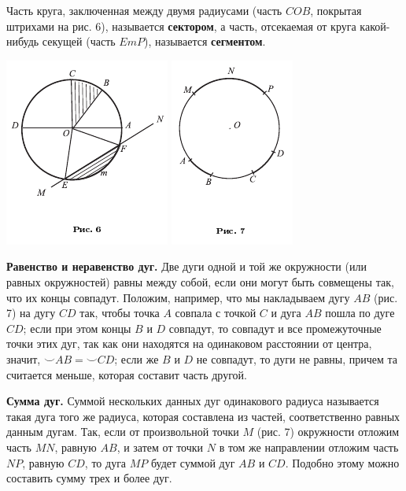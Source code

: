 \documentclass[oneside]{book}
\begin{document}
Часть круга, заключенная между двумя радиусами (часть $COB$, покрытая штрихами на рис. 6), называется \textbf{сектором}, а часть, отсекаемая от круга какой-нибудь секущей (часть $EmP$), называется \textbf{сегментом}.

\includegraphics{pics/ris-6}
\includegraphics{pics/ris-7}

\textbf{Равенство и неравенство дуг.}
Две дуги одной и той же окружности (или равных окружностей) равны между собой, если они могут быть совмещены так, что их концы совпадут.
Положим, например, что мы накладываем дугу $AB$ (рис. 7) на дугу $CD$ так, чтобы точка $A$ совпала с точкой $C$ и дуга $AB$ пошла по дуге $CD$;
если при этом концы $B$ и $D$ совпадут, то совпадут и все промежуточные точки этих дуг, так как они находятся на одинаковом расстоянии от центра, значит, ${\smallsmile} AB={\smallsmile} CD$;
если же $B$ и $D$ не совпадут, то дуги не равны, причем та считается меньше, которая составит часть другой.

\textbf{Сумма дуг.}
Суммой нескольких данных дуг одинакового радиуса называется такая дуга того же радиуса, которая составлена из частей, соответственно равных данным дугам.
Так, если от произвольной точки $M$ (рис. 7) окружности отложим часть $MN$, равную $AB$, и затем от точки $N$ в том же направлении отложим часть $NP$, равную $CD$, то дуга $MP$ будет суммой дуг $AB$ и $CD$.
Подобно этому можно составить сумму трех и более дуг.
\end{document}
